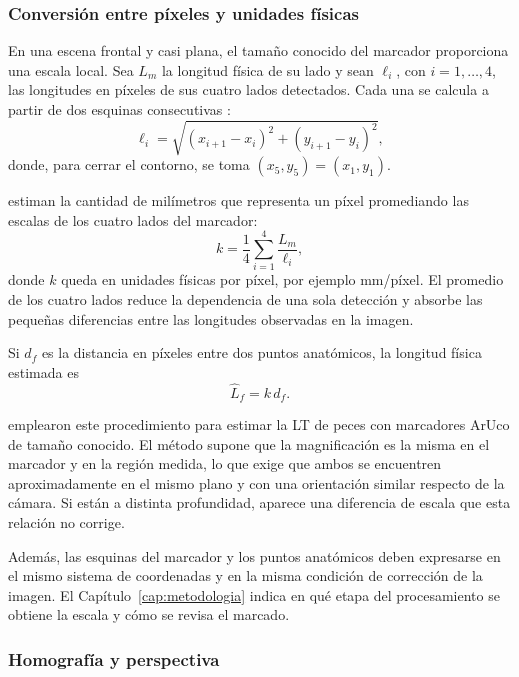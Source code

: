 \subsubsection{Conversión entre píxeles y unidades físicas}
\label{sec:conversion}

En una escena frontal y casi plana, el tamaño conocido del marcador proporciona una escala local. Sea $L_m$ la longitud física de su lado y sean $\ell_i$, con $i = 1, \ldots, 4$, las longitudes en píxeles de sus cuatro lados detectados. Cada una se calcula a partir de dos esquinas consecutivas \parencite{Monkman2019}:
\begin{equation}
\ell_i = \sqrt{(x_{i+1} - x_i)^2 + (y_{i+1} - y_i)^2},
\label{eq:lado}
\end{equation}
donde, para cerrar el contorno, se toma $(x_5, y_5) = (x_1, y_1)$.

\textcite{Monkman2019} estiman la cantidad de milímetros que representa un píxel promediando las escalas de los cuatro lados del marcador:
\begin{equation}
k = \frac{1}{4}\sum_{i=1}^{4}\frac{L_m}{\ell_i},
\label{eq:escala-monkman}
\end{equation}
donde $k$ queda en unidades físicas por píxel, por ejemplo mm/píxel. El promedio de los cuatro lados reduce la dependencia de una sola detección y absorbe las pequeñas diferencias entre las longitudes observadas en la imagen.

Si $d_f$ es la distancia en píxeles entre dos puntos anatómicos, la longitud física estimada \parencite{Monkman2019} es
\begin{equation}
\hat{L}_f = k\,d_f .
\label{eq:Lf}
\end{equation}

\textcite{Monkman2019} emplearon este procedimiento para estimar la LT de peces con marcadores ArUco de tamaño conocido. El método supone que la magnificación es la misma en el marcador y en la región medida, lo que exige que ambos se encuentren aproximadamente en el mismo plano y con una orientación similar respecto de la cámara. Si están a distinta profundidad, aparece una diferencia de escala que esta relación no corrige.

Además, las esquinas del marcador y los puntos anatómicos deben expresarse en el mismo sistema de coordenadas y en la misma condición de corrección de la imagen. El Capítulo~\ref{cap:metodologia} indica en qué etapa del procesamiento se obtiene la escala y cómo se revisa el marcado.

\subsubsection{Homografía y perspectiva}
\label{sec:homografia}

